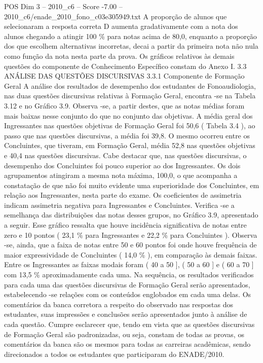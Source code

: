 \begin{textsample}{POS Dim 3 – 2010\_c6 – Score -7.00 – 2010\_c6/enade\_2010\_fono\_c03e305949.txt}
A proporção de alunos que selecionaram a resposta correta D aumenta gradativamente com a nota dos alunos chegando a atingir 100 \% para notas acima de 80,0, enquanto a proporção dos que escolhem alternativas incorretas, decai a partir da primeira nota não nula como função da nota nesta parte da prova.
Os gráficos relativos às demais questões do componente de Conhecimento Específico constam do Anexo I. 3.3 ANÁLISE DAS QUESTÕES DISCURSIVAS 3.3.1 Componente de Formação Geral A análise dos resultados de desempenho dos estudantes de Fonoaudiologia, nas duas questões discursivas relativas à Formação Geral, encontra -se na Tabela 3.12 e no Gráfico 3.9.
Observa -se, a partir destes, que as notas médias foram mais baixas nesse conjunto do que no conjunto das objetivas.
A média geral dos Ingressantes nas questões objetivas de Formação Geral foi 50,6 ( Tabela 3.4 ), ao passo que nas questões discursivas, a média foi 39,8.
O mesmo ocorreu entre os Concluintes, que tiveram, em Formação Geral, média 52,8 nas questões objetivas e 40,4 nas questões discursivas.
Cabe destacar que, nas questões discursivas, o desempenho dos Concluintes foi pouco superior ao dos Ingressantes.
Os dois agrupamentos atingiram a mesma nota máxima, 100,0, o que acompanha a constatação de que não foi muito evidente uma superioridade dos Concluintes, em relação aos Ingressantes, nesta parte do exame.
Os coeficientes de assimetria indicam assimetria negativa para Ingressantes e Concluintes.
Verifica -se a semelhança das distribuições das notas desses grupos, no Gráfico 3.9, apresentado a seguir.
Esse gráfico ressalta que houve incidência significativa de notas entre zero e 10 pontos ( 23,1 \% para Ingressantes e 22,2 \% para Concluintes ).
Observa -se, ainda, que a faixa de notas entre 50 e 60 pontos foi onde houve frequência de maior expressividade de Concluintes ( 14,0 \% ), em comparação às demais faixas.
Entre os Ingressantes as faixas modais foram ( 40 a 50 ], ( 50 a 60 ] e ( 60 a 70 ] com 13,5 \% aproximadamente cada uma.
Na sequência, os resultados verificados para cada uma das questões discursivas de Formação Geral serão apresentados, estabelecendo -se relações com os conteúdos englobados em cada uma delas.
Os comentários da banca corretora a respeito do observado nas respostas dos estudantes, suas impressões e conclusões serão apresentados junto à análise de cada questão.
Cumpre esclarecer que, tendo em vista que as questões discursivas de Formação Geral são padronizadas, ou seja, constam de todas as provas, os comentários da banca são os mesmos para todas as carreiras acadêmicas, sendo direcionados a todos os estudantes que participaram do ENADE/2010.

\end{textsample}
